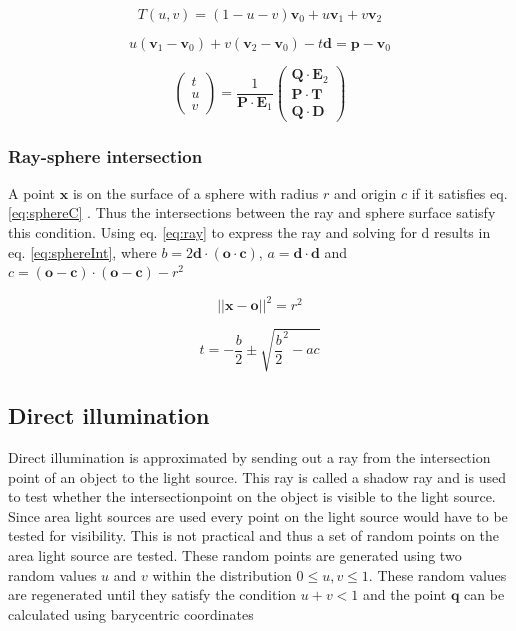 \documentclass[twocolumn]{article}
\begin{document}
\begin{equation}
	\label{eq:bc}	
	T(u,v) = (1 - u - v)\mathbf{v}_0 + u\mathbf{v}_1 + v\mathbf{v}_2
\end{equation}

\begin{equation}
	\label{eq:simp}
	u(\mathbf{v}_1 - \mathbf{v}_0) + v(\mathbf{v}_2 - \mathbf{v}_0) - t\mathbf{d} = \mathbf{p} - \mathbf{v}_0
\end{equation}

\begin{equation}
\label{eq:triInt}
\begin{pmatrix}
	t \\
  	u \\
  	v 
\end{pmatrix}
= \frac{1}{\mathbf{P} \cdot \mathbf{E}_1}
\begin{pmatrix}
	  	\mathbf{Q} \cdot \mathbf{E}_2 \\
  		\mathbf{P} \cdot \mathbf{T} \\
  		\mathbf{Q} \cdot \mathbf{D}
\end{pmatrix}
\end{equation}

\subsubsection{Ray-sphere intersection}
A point $\mathbf{x}$ is on the surface of a sphere with radius $r$ and origin $c$ if it satisfies eq. \ref{eq:sphereC} \cite{hq}. Thus the intersections between the ray and sphere surface satisfy this condition. Using eq. \ref{eq:ray} to express the ray and solving for d results in eq. \ref{eq:sphereInt}, where $b = 2\mathbf{d} \cdot (\mathbf{o} \cdot \mathbf{c})$, $a = \mathbf{d} \cdot \mathbf{d}$ and $c = (\mathbf{o} - \mathbf{c}) \cdot (\mathbf{o} - \mathbf{c}) - r^2$

\begin{equation}
	\label{eq:sphereC}
	||\mathbf{x} - \mathbf{o}||^2 = r^2
\end{equation}

\begin{equation}
	\label{eq:sphereInt}
	t = - \frac{b}{2} \pm \sqrt{\frac{b}{2}^2 - ac}
\end{equation}

\subsection{Direct illumination}
Direct illumination is approximated by sending out a ray from the intersection point of an object to the light source. This ray is called a shadow ray and is used to test whether the intersectionpoint on the object is visible to the light source. Since area light sources are used every point on the light source would have to be tested for visibility. This is not practical and thus a set of random points on the area light source are tested. These random points are generated using two random values $u$ and $v$ within the distribution $0 \leq u,v \leq 1$. These random values are regenerated until they satisfy the condition $u + v < 1$ and the point $\mathbf{q}$ can be calculated using barycentric coordinates
\end{document}
